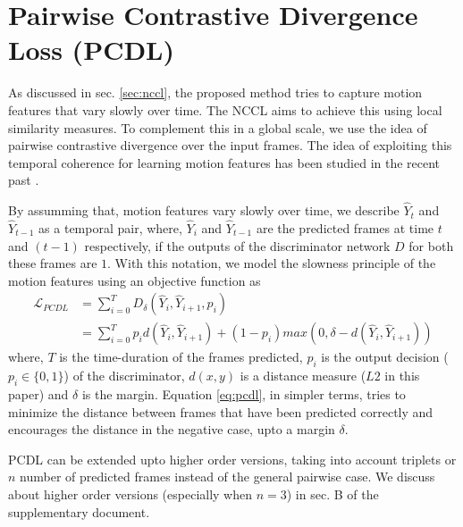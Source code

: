 \documentclass{article}
\begin{document}
\section{Pairwise Contrastive Divergence Loss (PCDL)}
  \label{sec:pcdl}
  As discussed in sec. \ref{sec:nccl}, the proposed method tries to capture motion features that vary slowly over time. The NCCL aims to achieve this using local similarity measures. To complement this in a global scale, we use the idea of pairwise contrastive divergence over the input frames. The idea of exploiting this temporal coherence for learning motion features has been studied in the recent past \cite{goroshin2015unsupervised, hadsell2006dimensionality,  mobahi2009deep}.
  
  By assumming that, motion features vary slowly over time, we describe $ \hat{Y}_t $ and $ \hat{Y}_{t-1} $ as a temporal pair, where, $ \hat{Y}_i $ and $ \hat{Y}_{t-1} $ are the predicted frames at time $ t $ and $ (t-1) $ respectively, if the outputs of the discriminator network $ D $ for both these frames are $ 1 $. With this notation, we model the slowness principle of the motion features using an objective function as
  \begin{equation}
	  \begin{split}
		  \mathcal{L}_{PCDL} & = \sum_{i = 0}^{T} D_{\delta}(\hat{Y}_i, \hat{Y}_{i + 1}, p_i) \\
		  & = \sum_{i = 0}^{T} p_i d(\hat{Y}_i, \hat{Y}_{i + 1}) + (1 - p_i) max(0, \delta - d(\hat{Y}_i, \hat{Y}_{i + 1}))
	  \end{split}
	  \label{eq:pcdl}
  \end{equation}   
  where, $ T $ is the time-duration of the frames predicted, $ p_i $ is the output decision ($p_i \in \{0, 1\} $) of the discriminator, $ d(x, y) $ is a distance measure ($ L2 $ in this paper) and $ \delta $ is the margin. Equation \ref{eq:pcdl}, in simpler terms, tries to minimize the distance between frames that have been predicted correctly and encourages the distance in the negative case, upto a margin $ \delta $.
  
  PCDL can be extended upto higher order versions, taking into account triplets or $ n $ number of predicted frames instead of the general pairwise case. We discuss about higher order versions (especially when $ n = 3 $) in sec. B of the supplementary document.
\end{document}
